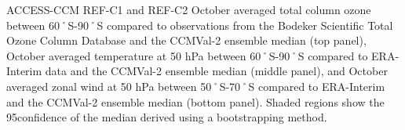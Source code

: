 ACCESS-CCM REF-C1 and REF-C2 October averaged total column ozone between 60˚S-90˚S compared to observations from the Bodeker Scientific Total Ozone Column Database and the CCMVal-2 ensemble median (top panel), October averaged temperature at 50 hPa between 60˚S-90˚S compared to ERA-Interim data and the CCMVal-2 ensemble median (middle panel), and October averaged zonal wind at 50 hPa between 50˚S-70˚S compared to ERA-Interim and the CCMVal-2 ensemble median (bottom panel). Shaded regions show the 95\perc confidence of the median derived using a bootstrapping method.
